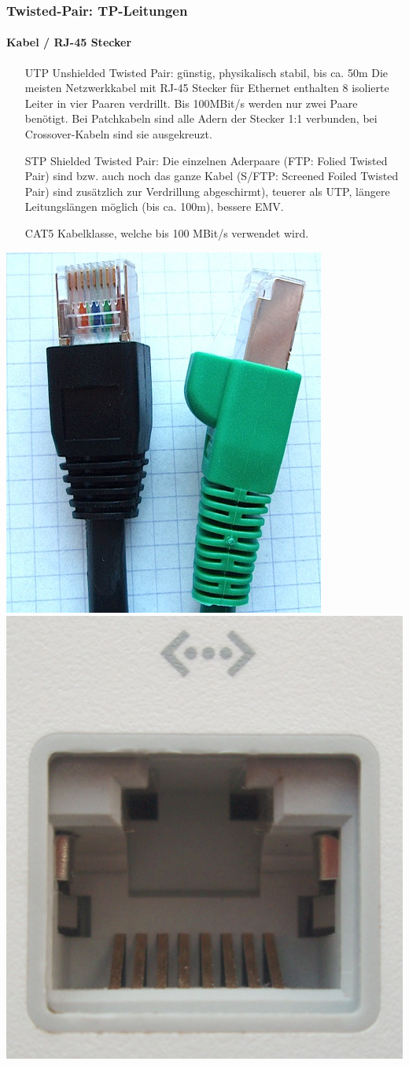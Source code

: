 \documentclass[ignorenonframetext]{beamer}
\begin{document}
\begin{frame}
\frametitle{Twisted-Pair: TP-Leitungen}
\framesubtitle{Kabel / RJ-45 Stecker}


\begin{itemize}
\item [UTP] Unshielded Twisted Pair: g\"unstig, physikalisch stabil, bis ca. 50m
Die meisten Netzwerkkabel mit RJ-45 Stecker f\"ur Ethernet
	enthalten 8 isolierte Leiter in vier Paaren verdrillt. Bis 
	100MBit/s werden nur zwei Paare ben\"otigt.
	Bei Patchkabeln sind alle Adern der Stecker 1:1 verbunden,
	bei Crossover-Kabeln sind sie ausgekreuzt.
\item [STP] Shielded Twisted Pair: Die einzelnen Aderpaare (FTP:
 Folied Twisted Pair)  sind bzw. auch noch 
	das ganze Kabel (S/FTP: Screened Foiled Twisted Pair) sind
	 zus\"atzlich zur Verdrillung abgeschirmt), teuerer als UTP, 
	 l\"angere Leitungsl\"angen m\"oglich (bis ca. 100m), bessere EMV.

\item [CAT5] Kabelklasse, welche bis 100 MBit/s verwendet wird.
\end{itemize}
\includegraphics[width=2.5cm\textwidth]{rj45Stecker.jpg}
\includegraphics[width=2.5cm\textwidth]{rj45Buchse.jpg}

\end{frame}
\end{document}
